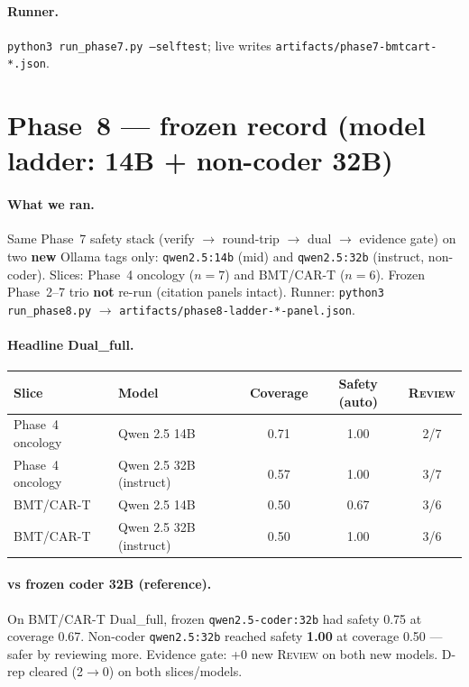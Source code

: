 \documentclass[11pt,a4paper]{article}
\newcommand{\rev}{\textsc{Review}}
\begin{document}
\paragraph{Runner.}
\texttt{python3 run\_phase7.py --selftest}; live writes \texttt{artifacts/phase7-bmtcart-*.json}.

\section{Phase~8 --- frozen record (model ladder: 14B + non-coder 32B)}

\paragraph{What we ran.}
Same Phase~7 safety stack (verify $\rightarrow$ round-trip $\rightarrow$ dual $\rightarrow$ evidence gate) on two \textbf{new} Ollama tags only:
\texttt{qwen2.5:14b} (mid) and \texttt{qwen2.5:32b} (instruct, non-coder).
Slices: Phase~4 oncology ($n=7$) and BMT/CAR-T ($n=6$).
Frozen Phase~2--7 trio \textbf{not} re-run (citation panels intact).
Runner: \texttt{python3 run\_phase8.py} $\rightarrow$ \texttt{artifacts/phase8-ladder-*-panel.json}.

\paragraph{Headline Dual\_full.}
\begin{center}
\small
\begin{tabular}{llccc}
\toprule
Slice & Model & Coverage & Safety (auto) & \rev{} \\
\midrule
Phase~4 oncology & Qwen 2.5 14B & 0.71 & 1.00 & 2/7 \\
Phase~4 oncology & Qwen 2.5 32B (instruct) & 0.57 & 1.00 & 3/7 \\
BMT/CAR-T & Qwen 2.5 14B & 0.50 & 0.67 & 3/6 \\
BMT/CAR-T & Qwen 2.5 32B (instruct) & 0.50 & 1.00 & 3/6 \\
\bottomrule
\end{tabular}
\end{center}

\paragraph{vs frozen coder 32B (reference).}
On BMT/CAR-T Dual\_full, frozen \texttt{qwen2.5-coder:32b} had safety 0.75 at coverage 0.67.
Non-coder \texttt{qwen2.5:32b} reached safety \textbf{1.00} at coverage 0.50 --- safer by reviewing more.
Evidence gate: +0 new \rev{} on both new models. D-rep cleared (2$\rightarrow$0) on both slices/models.
\end{document}
